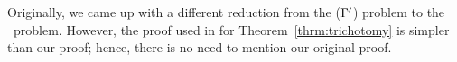 Originally, we came up with a different reduction from the \ccsp(\(\Gamma'\)) problem
to the \cdsp\ problem. However, the proof used in \cite{Trichotomy} for
Theorem~\ref{thrm:trichotomy} is simpler than our proof; hence, there is no need to 
mention our original proof.
\begin{comment}
The reduction uses Theorem~\ref{thrm:majority} to break arbitrary relation to binary relation.
A function \(m: D^3\to D\) is said to be a \emph{majority function}, if for any \(x,y\in D\) we have
\(m(x,x,y) = m(x,y,x) = m(y, x, x) = x\)\@. We denote the projection of \mR\ on coordinates \(i\) and
 \(j\) by \(R_{1,2}\) and projections of \mR\ on coordinates from \(i\) to \(j\) by \(R_{i-j}\)\@.


\begin{theorem} [Bergman's Double-projection Theorem (Unpublished)]\label{thrm:majority}
Let \mR\ be a relation of arity \mn\ on domain \(D\) and
\(m\) be a majority function on the same domain.
If \mm\ is a polymorphism for \mR, then \mR\ can be expressed by all 
its binary projections as \(R(x_1,\dotsc,x_n) = \bigwedge_{i,j} R_{i,j}(x_i,x_j)\)\@.
\end{theorem}

We provide our own proof for this theorem.

\begin{proof}
It is trivial that \mR\ implies all its binary projection. We  prove that
binary projections of \mR\ implies \mR\@.
We proceed by induction on \(t\) the arity of the relation \mR\@.
For \(t=2\), the statement is trivial. We show that
if the statement is true for \(t=n-1\) it is also true for \(t=n\)\@.
We want to prove \(\bigwedge_{i,j} R_{i,j}(x_i,x_j) \implies R(x_1,\dotsc, x_n)\).
By induction hypothesis \(R_{1-(n-1)}(x_1,\dotsc,x_{n-1})\) and \(R_{2-n}(x_2,\dots,x_n)\)
is true because \(R_{1-(n-1)}\) and \(R_{2-n})\) are closed under \mm\@.
By hypothesis, \(R_{1,n}(x_1,x_n)\) is also true. Since these relations are projection of \mR,
there are \(y_1,\dotsc,y_n \in D\) such that 
\(R(x_1,\dotsc,x_{n-1},y_n)\), \(R(y_1,x_2,\dotsc,x_n)\), and \(R(x_1,y_2,\dotsc,y_{n-1},x_n)\)
are true. Since \mm\ is a polymorphism of \mR, \(R(x_1,\dotsc,x_n)\) is true.
\end{proof}

For every monotone
relation, we can find a majority projection using \(\vee\) and \(\wedge\) operators. One
example would be \(m(x,y,z)=(x \vee y) \wedge (x \vee z) \wedge (y \vee z)\)\@. 
Thus, every instance of the \ccsp(\(\relset'\)) problem can be parsimoniously reduced to
a \ccsp(\\)) instance, where \(\relset''\) is the binary monotone constraint language.
Finally, \ccsp(\(\relset''\)
\end{comment}

